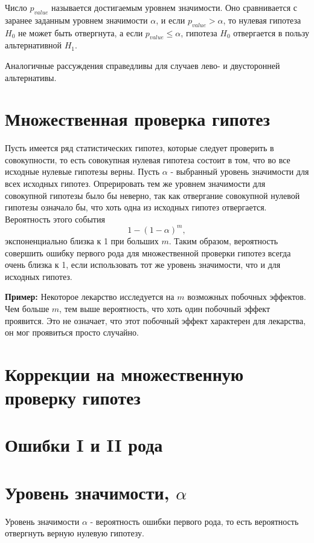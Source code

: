 Число $p_{value}$ называется достигаемым уровнем значимости. Оно сравнивается с заранее заданным уровнем значимости $\alpha$, и если $p_{value} > \alpha$, то нулевая гипотеза $H_0$ не может быть отвергнута, а если $p_{value} \leqslant \alpha$, гипотеза $H_0$ отвергается в пользу альтернативной $H_1$.

Аналогичные рассуждения справедливы для случаев лево- и двусторонней альтернативы.

\section{Множественная проверка гипотез}

Пусть имеется ряд статистических гипотез, которые следует проверить в совокупности, то есть совокупная нулевая гипотеза состоит в том, что во все исходные нулевые гипотезы верны. Пусть $\alpha$ - выбранный уровень значимости для всех исходных гипотез. Опрерировать тем же уровнем значимости для совокупной гипотезы было бы неверно, так как отвергание совокупной нулевой гипотезы означало бы, что хоть одна из исходных гипотез отвергается. Вероятность этого события
$$
1 - (1 - \alpha)^m,
$$
экспоненциально близка к 1 при больших $m$. Таким образом, вероятность совершить ошибку первого рода для множественной проверки гипотез всегда очень близка к 1, если использовать тот же уровень значимости, что и для исходных гипотез.

\textbf{Пример:} Некоторое лекарство исследуется на $m$ возможных побочных эффектов. Чем больше $m$, тем выше вероятность, что хоть один побочный эффект проявится. Это не означает, что этот побочный эффект характерен для лекарства, он мог проявиться просто случайно.

\section{Коррекции на множественную проверку гипотез}

\section{Ошибки I и II рода}


\section{Уровень значимости, $\alpha$}

Уровень значимости $\alpha$ - вероятность ошибки первого рода, то есть вероятность отвергнуть верную нулевую гипотезу.


